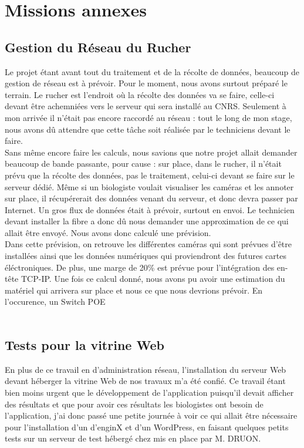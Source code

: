 \documentclass[11pt,french,a4paper]{report}
\begin{document}
    \section{Missions annexes}
        \subsection{Gestion du Réseau du Rucher}
Le projet étant avant tout du traitement et de la récolte de données, beaucoup de gestion de réseau est à prévoir. Pour le moment,
nous avons surtout préparé le terrain. Le rucher est l'endroit où la récolte des données va se faire, celle-ci devant être achemniées vers
le serveur qui sera installé au CNRS. Seulement à mon arrivée il n'était pas encore raccordé au réseau : tout le long de mon stage, 
nous avons dû attendre que cette tâche soit réalisée par le techniciens devant le faire. \\
Sans même encore faire les calculs, nous savions que notre projet allait demander beaucoup de bande passante, pour cause :
sur place, dans le rucher, il n'était prévu que la récolte des données, pas le traitement, celui-ci devant se faire sur le serveur dédié. 
Même si un biologiste voulait visualiser les caméras et les annoter sur place, il récupérerait des données venant du serveur, et donc 
devra passer par Internet. Un gros flux de données était à prévoir, surtout en envoi. Le technicien devant installer la fibre a 
donc dû nous demander une approximation de ce qui allait être envoyé. Nous avons donc calculé une prévision. \\
Dans cette prévision, on retrouve les différentes caméras qui sont prévues d'être installées ainsi que les données numériques qui proviendront des 
futures cartes éléctroniques. De plus, une marge de 20\% est prévue pour l'intégration des en-tête TCP-IP. Une fois ce calcul donné, 
nous avons pu avoir une estimation du matériel qui arrivera sur place et nous ce que nous devrions prévoir. En l'occurence, 
un Switch POE  \\ 

        \subsection{Tests pour la vitrine Web}
En plus de ce travail en d'administration réseau, l'installation du serveur Web devant héberger la vitrine Web de nos travaux m'a été confié. 
Ce travail étant bien moins urgent que le développement de l'application puisqu'il devait afficher des résultats et que pour avoir ces 
résultats les biologistes ont besoin de l'application, j'ai donc passé une petite journée à voir ce qui allait être nécessaire pour l'installation
d'un d'enginX et d'un WordPress, en faisant quelques petits tests sur un serveur de test hébergé chez %
mis en place par M. DRUON. \\
\end{document}
